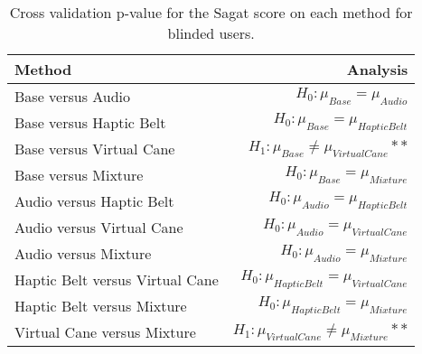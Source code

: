 
\begin{table}[!htb]
\centering
\caption{Cross validation p-value for the Sagat score on each method for blinded users.}
\label{tab:lsd_sagat_avg}
\begin{tabular}{lr}
\toprule
                         Method &                                       Analysis \\
\midrule
              Base versus Audio &               $H_0 : \mu_{Base} = \mu_{Audio}$ \\
        Base versus Haptic Belt &         $H_0 : \mu_{Base} = \mu_{Haptic Belt}$ \\
       Base versus Virtual Cane &    $H_1 : \mu_{Base} \ne \mu_{Virtual Cane}**$ \\
            Base versus Mixture &             $H_0 : \mu_{Base} = \mu_{Mixture}$ \\
       Audio versus Haptic Belt &        $H_0 : \mu_{Audio} = \mu_{Haptic Belt}$ \\
      Audio versus Virtual Cane &       $H_0 : \mu_{Audio} = \mu_{Virtual Cane}$ \\
           Audio versus Mixture &            $H_0 : \mu_{Audio} = \mu_{Mixture}$ \\
Haptic Belt versus Virtual Cane & $H_0 : \mu_{Haptic Belt} = \mu_{Virtual Cane}$ \\
     Haptic Belt versus Mixture &      $H_0 : \mu_{Haptic Belt} = \mu_{Mixture}$ \\
    Virtual Cane versus Mixture & $H_1 : \mu_{Virtual Cane} \ne \mu_{Mixture}**$ \\
\bottomrule
\end{tabular}
\end{table}

